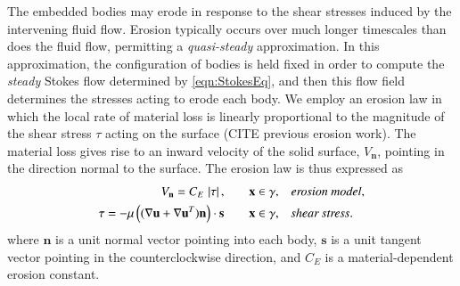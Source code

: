 \documentclass[3p]{elsarticle}
\newcommand{\nn}{{\mathbf{n}}}
\renewcommand{\ss}{{\mathbf{s}}}
\newcommand{\uu}{{\mathbf{u}}}
\newcommand{\UU}{{\mathbf{U}}}
\newcommand{\xx}{{\mathbf{x}}}
\newcommand{\abs}[1]{\left| #1 \right|}
\newcommand{\Vn}{V_\nn}
\newcommand{\CE}{C_E}
\begin{document}
The embedded bodies may erode in response to the shear stresses induced by the intervening fluid flow. Erosion typically occurs over much longer timescales than does the fluid flow, permitting a {\em quasi-steady} approximation. In this approximation, the configuration of bodies is held fixed in order to compute the {\em steady} Stokes flow determined by \eqref{eqn:StokesEq}, and then this flow field determines the stresses acting to erode each body. We employ an erosion law in which the local rate of material loss is linearly proportional to the magnitude of the shear stress $\tau$ acting on the surface (CITE previous erosion work). The material loss gives rise to an inward velocity of the solid surface, $\Vn$, pointing in the direction normal to the surface. The erosion law is thus expressed as
\begin{align}
\Vn = \CE \, \abs{\tau}, 
	&\hspace{20pt} \xx \in \gamma, &&\mbox{\em erosion model}, 
\label{Vn0} \\
\tau = -\mu \left( ( \nabla \uu + \nabla \uu^T) \nn \right) \cdot \ss
	&\hspace{20pt} \xx \in \gamma, &&\mbox{\em shear stress}.
\label{tau0}
\end{align}
where $\nn$ is a unit normal vector pointing into each body, $\ss$ is
a unit tangent vector pointing in the counterclockwise direction, and $\CE$ is a material-dependent erosion constant.




\end{document}

